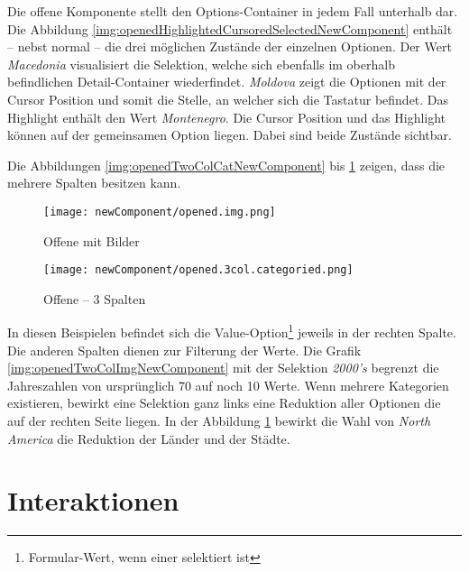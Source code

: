 Die offene Komponente stellt den Options-Container in jedem Fall unterhalb dar. 
Die Abbildung \ref{img:openedHighlightedCursoredSelectedNewComponent} enthält – nebst normal – die drei möglichen Zustände der einzelnen Optionen. 
Der Wert \emph{Macedonia} visualisiert die Selektion, welche sich ebenfalls im oberhalb befindlichen Detail-Container wiederfindet. 
\emph{Moldova} zeigt die Optionen mit der Cursor Position und somit die Stelle, an welcher sich die Tastatur befindet. 
Das Highlight enthält den Wert \emph{Montenegro}. 
Die Cursor Position und das Highlight können auf der gemeinsamen Option liegen. 
Dabei sind beide Zustände sichtbar. 

Die Abbildungen \ref{img:openedTwoColCatNewComponent} bis \ref{img:openedThreeColCatNewComponent} zeigen, dass die  mehrere Spalten besitzen kann. 

\begin{figure}[!htb]
    \begin{minipage}[b]{0.43\textwidth}
        \centering
        \texttt{[image: newComponent/opened.img.png]}
        \caption{\centering Offene  mit Bilder}
        \label{img:openedTwoColImgNewComponent}
    \end{minipage}
    \hfill
    \begin{minipage}[b]{0.47\textwidth}
        \centering
        \texttt{[image: newComponent/opened.3col.categoried.png]}
        \caption{\centering Offene  – 3 Spalten}
        \label{img:openedThreeColCatNewComponent}
    \end{minipage}
\end{figure}

In diesen Beispielen befindet sich die Value-Option\footnote{
    Formular-Wert, wenn einer selektiert ist
} jeweils in der rechten Spalte. 
Die anderen Spalten dienen zur Filterung der Werte. 
Die Grafik \ref{img:openedTwoColImgNewComponent} mit der Selektion \emph{2000's} begrenzt die Jahreszahlen von ursprünglich 70 auf noch 10 Werte. 
Wenn mehrere Kategorien existieren, bewirkt eine Selektion ganz links eine Reduktion aller Optionen die auf der rechten Seite liegen. 
In der Abbildung \ref{img:openedThreeColCatNewComponent} bewirkt die Wahl von \emph{North America} die Reduktion der Länder und der Städte. 


\section{Interaktionen} %
\label{sec:interaction}

